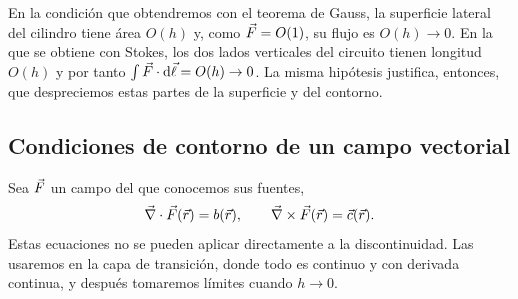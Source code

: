 \begin{observacion}\label{obs:hipotesis}
En la condición que obtendremos con el teorema de Gauss, la superficie lateral del cilindro tiene área $O(h)$ y, como $\vec{F}=O(1)$, su flujo es $O(h)\to0$. En la que se
obtiene con Stokes, los dos lados verticales del circuito tienen longitud $O(h)$ y por tanto $\int\vec{F}\cdot\mathrm{d}\vec{\ell}=O(h)\to0$. La misma hipótesis justifica, entonces, que despreciemos
estas partes de la superficie y del contorno.
\end{observacion}

\subsection{Condiciones de contorno de un campo vectorial}\label{sec:contorno-general}
Sea $\vec{F}$ un campo del que conocemos sus fuentes,
\begin{equation}\label{eq:fuentes}
  \vec{\nabla}\cdot\vec{F}(\vec{r})=b(\vec{r}),\qquad\vec{\nabla}\times\vec{F}(\vec{r})=\vec{c}(\vec{r}).
\end{equation}
Estas ecuaciones no se pueden aplicar directamente a la discontinuidad. Las usaremos en la capa de transición, donde todo es continuo y con derivada continua, y después
tomaremos límites cuando $h\to0$.

